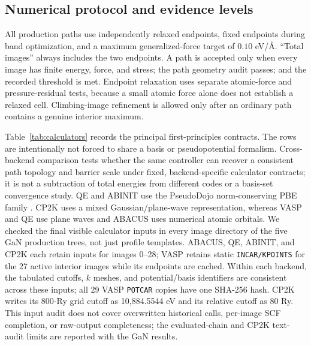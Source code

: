 \documentclass[final,5p,times,twocolumn]{elsarticle}
\begin{document}
\subsection{Numerical protocol and evidence levels}

All production paths use independently relaxed endpoints, fixed endpoints
during band optimization, and a maximum generalized-force target of
$0.10$ eV/\AA{}. ``Total images'' always includes the two endpoints. A path is
accepted only when every image has finite energy, force, and stress; the path
geometry audit passes; and the recorded threshold is met. Endpoint relaxation
uses separate atomic-force and pressure-residual tests, because a small atomic
force alone does not establish a relaxed cell. Climbing-image refinement is
allowed only after an ordinary path contains a genuine interior maximum.

Table~\ref{tab:calculators} records the principal first-principles contracts.
The rows are intentionally not forced to share a basis or pseudopotential
formalism. Cross-backend comparison tests whether the same controller can
recover a consistent path topology and barrier scale under fixed,
backend-specific calculator contracts; it is not a subtraction of total
energies from different codes or a basis-set convergence study. QE and ABINIT
use the PseudoDojo norm-conserving PBE family
\cite{vanSetten2018}. CP2K uses a mixed Gaussian/plane-wave representation,
whereas VASP and QE use plane waves and ABACUS uses numerical atomic orbitals.
We checked the final visible calculator inputs in every image directory of
the five GaN production trees, not just profile templates. ABACUS, QE,
ABINIT, and CP2K each retain inputs for images 0--28; VASP retains static
\texttt{INCAR/KPOINTS} for the 27 active interior images while its endpoints
are cached. Within each backend, the tabulated cutoffs, $k$ meshes, and
potential/basis identifiers are consistent across these inputs; all 29 VASP
\texttt{POTCAR} copies have one SHA-256 hash. CP2K writes its 800-Ry grid
cutoff as 10,884.5544 eV and its relative cutoff as 80 Ry. This input
audit does not cover overwritten historical calls, per-image SCF completion,
or raw-output completeness; the evaluated-chain and CP2K text-audit limits
are reported with the GaN results.
\end{document}
